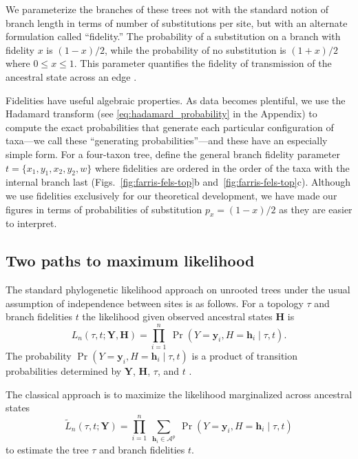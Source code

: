 \documentclass[11pt]{article}
\newcommand{\alphabet}{\mathcal{A}}
\newcommand{\fullAlignment}{\mathbf{Y}}
\newcommand{\alignmentColumn}{\mathbf{y}}
\newcommand{\alignmentColumnRV}{Y}
\newcommand{\fullAncestralStates}{\mathbf{H}}
\newcommand{\ancestralStateColumn}{\mathbf{h}}
\newcommand{\ancestralStateColumnRV}{H}
\newcommand{\nCols}{n}
\newcommand{\nAncestralStateRows}{p}
\begin{document}
We parameterize the branches of these trees not with the standard notion of branch length in terms of number of substitutions per site, but with an alternate formulation called ``fidelity.''
The probability of a substitution on a branch with fidelity $x$ is $(1-x)/2$, while the probability of no substitution is $(1+x)/2$ where $0 \le x \le 1$.
This parameter quantifies the fidelity of transmission of the ancestral state across an edge \citep{Matsen2007-jq}.

Fidelities have useful algebraic properties.
As data becomes plentiful, we use the Hadamard transform (see \eqref{eq:hadamard_probability} in the Appendix) to compute the exact probabilities that generate each particular configuration of taxa---we call these ``generating probabilities''---and these have an especially simple form.
For a four-taxon tree, define the general branch fidelity parameter $t=\{x_1,y_1,x_2,y_2,w\}$ where fidelities are ordered in the order of the taxa with the internal branch last (Figs.~\ref{fig:farris-fels-top}b and~\ref{fig:farris-fels-top}c).
Although we use fidelities exclusively for our theoretical development, we have made our figures in terms of probabilities of substitution $p_{x} = (1-x)/2$ as they are easier to interpret.

\subsection*{Two paths to maximum likelihood}

The standard phylogenetic likelihood approach on unrooted trees under the usual assumption of independence between sites is as follows.
For a topology $\tau$ and branch fidelities $t$ the likelihood given observed ancestral states $\fullAncestralStates$ is
\begin{equation}
\label{eq:full_likelihood}
L_\nCols(\tau, t; \fullAlignment,\fullAncestralStates) = \prod_{i=1}^{\nCols} \ \Pr(\alignmentColumnRV=\alignmentColumn_i, \ancestralStateColumnRV=\ancestralStateColumn_i \mid \tau, t).
\end{equation}
The probability $\Pr(\alignmentColumnRV=\alignmentColumn_i, \ancestralStateColumnRV=\ancestralStateColumn_i \mid \tau, t)$ is a product of transition probabilities determined by $\fullAlignment$, $\fullAncestralStates$, $\tau$, and $t$ \citep{Felsenstein2004}.

The classical approach is to maximize the likelihood marginalized across ancestral states
\begin{equation}
\label{eq:marginal_likelihood}
\tilde{L}_\nCols(\tau, t; \fullAlignment) = \prod_{i=1}^{\nCols} \ \sum_{\ancestralStateColumn_i\in\alphabet^{\nAncestralStateRows}} \ \Pr(\alignmentColumnRV=\alignmentColumn_i, \ancestralStateColumnRV=\ancestralStateColumn_i \mid \tau, t)
\end{equation}
to estimate the tree $\tau$ and branch fidelities $t$.
\end{document}
